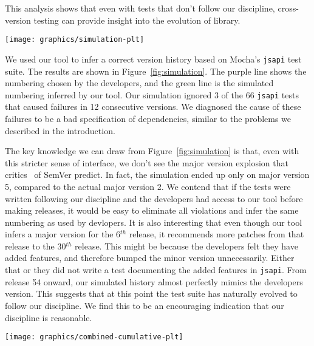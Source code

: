 This analysis shows that even with tests that don't follow our
discipline, cross-version testing can provide insight into the
evolution of library.

\begin{figure*}
\centering
\texttt{[image: graphics/simulation-plt]}
\caption{Simulation of version histories}%
\label{fig:simulation}
\end{figure*}

We used our tool to infer a correct version history based on Mocha's
{\tt jsapi} test suite. The results are shown in
Figure~\ref{fig:simulation}. The purple line shows the numbering
chosen by the developers, and the green line is the simulated
numbering inferred by our tool.  Our simulation ignored 3 of the 66
{\tt jsapi} tests that caused failures in 12 consecutive versions. We
diagnosed the cause of these failures to be a bad specification of
dependencies, similar to the problems we described in the
introduction.

The key knowledge we can draw from Figure~\ref{fig:simulation} is
that, even with this stricter sense of interface, we don't see the
major version explosion that critics~\cite{crawford-not-semver,
  backbone-2888, exoplayer-1382} of SemVer predict. In fact, the
simulation ended up only on major version 5, compared to the actual
major version 2. We contend that if the tests were written following
our discipline and the developers had access to our tool before making
releases, it would be easy to eliminate all violations and infer the
same numbering as used by devlopers. It is also interesting that even
though our tool infers a major version for the 6$^{th}$ release, it
recommends more patches from that release to the 30$^{th}$
release. This might be because the developers felt they have added
features, and therefore bumped the minor version
unnecessarily. Either that or they did not write a test documenting
the added features in {\tt jsapi}. From release 54 onward, our
simulated history almost perfectly mimics the developers
version. This suggests that at this point the test suite has
naturally evolved to follow our discipline. We find this to be an
encouraging indication that our discipline is reasonable.

\begin{figure*}
\centering
\texttt{[image: graphics/combined-cumulative-plt]}
\caption{Cumulative names of violated tests} 
\label{fig:cumulative}
\end{figure*}


